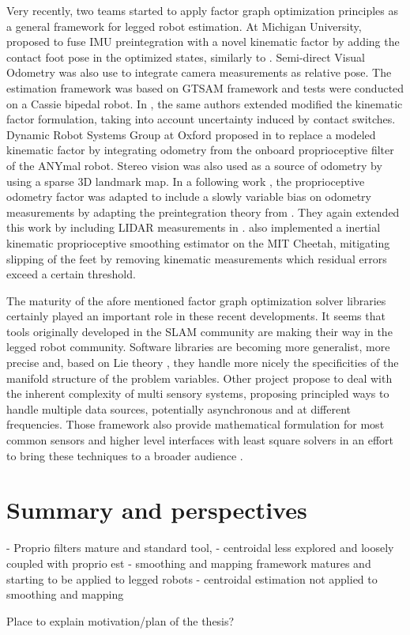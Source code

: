 Very recently, two teams started to apply factor graph optimization principles as a general framework for legged robot estimation. At Michigan University, \cite{hartley2018legged} 
proposed to fuse IMU preintegration with a novel kinematic factor by adding the contact foot pose in the optimized states, similarly to \cite{bloesch2013state,rotella2014state}. 
Semi-direct Visual Odometry \cite{forster2014svo} was also use to integrate camera measurements as relative pose. The estimation framework was based on GTSAM framework \cite{dellaert2012factor}
and tests were conducted on a Cassie bipedal robot. In \cite{hartley2018hybrid}, the same authors extended 
modified the kinematic factor formulation, taking into account uncertainty induced by contact switches. Dynamic Robot Systems Group at Oxford proposed in 
\cite{wisth2019robust} to replace a modeled kinematic factor by integrating odometry from the onboard proprioceptive filter of the ANYmal robot. Stereo vision was also used as a source of
odometry by using a sparse 3D landmark map. In a following work \cite{wisth2020preintegrated}, the proprioceptive odometry factor was adapted
to include a slowly variable bias on odometry measurements by adapting the preintegration theory from \cite{forster2017-TRO}. They again extended this work
by including LIDAR measurements in \cite{wisth2021vilens}.
\cite{kim2021legged} also implemented a inertial kinematic proprioceptive smoothing estimator on the MIT Cheetah, mitigating slipping of the feet by removing kinematic measurements which residual errors exceed a certain threshold.    


The maturity of the afore mentioned factor graph optimization solver libraries certainly played an important role in these recent developments. It seems
that tools originally developed in the SLAM community are making their way in the legged robot community. Software libraries are becoming more
generalist, more precise and, based on Lie theory \cite{sola2018micro}, they handle more nicely the specificities of the manifold structure of the problem variables.
Other project propose to deal with the inherent complexity of multi sensory systems, proposing principled ways to handle multiple data sources, potentially asynchronous and at
different frequencies. Those framework also provide mathematical formulation for most common sensors and higher level interfaces with least square solvers 
in an effort to bring these techniques to a broader audience \cite{sola2021wolf, blanco2019modular, colosi2020plug}.



\section{Summary and perspectives}
- Proprio filters mature and standard tool, 
- centroidal less explored and loosely coupled with proprio est
- smoothing and mapping framework matures and starting to be applied to legged robots
- centroidal estimation not applied to smoothing and mapping

Place to explain motivation/plan of the thesis?
